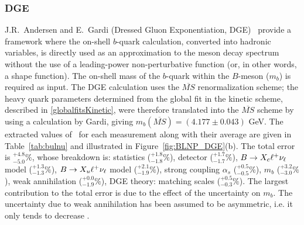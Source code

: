 \subsubsection{DGE}
J.R.~Andersen and E.~Gardi (Dressed Gluon Exponentiation, DGE)~\cite{ref:DGE} provide
a framework where the on-shell $b$-quark calculation, converted into hadronic variables, is
directly used as an approximation to the meson decay spectrum without
the use of a leading-power non-perturbative function (or, in other words,
a shape function). The on-shell mass of the $b$-quark within the $B$-meson ($m_b$) is
required as input. 
The DGE calculation uses the $\overline{MS}$ renormalization scheme; the heavy quark parameters determined  
from the global fit in the kinetic scheme, described in \ref{globalfitsKinetic}, were therefore 
translated into the $\overline{MS}$ scheme by using a calculation by Gardi, giving 
$m_b({\overline{MS}})=(4.177 \pm 0.043)$ GeV.
The extracted values
of \vub\, for each measurement along with their average are given in
Table~\ref{tab:bulnu} and illustrated in Figure~\ref{fig:BLNP_DGE}(b).
The total error is $^{+4.8}_{-5.0}\%$, whose breakdown is:
statistics ($^{+1.8}_{-1.8}\%$),
detector ($^{+1.7}_{-1.7}\%$),
$B\to X_c \ell^+ \nu_\ell$ model ($^{+1.3}_{-1.3}\%$),
$B\to X_u \ell^+ \nu_\ell$ model ($^{+2.1}_{-1.9}\%$),
strong coupling $\alpha_s$ ($^{+0.5}_{-0.5}\%$),
$m_b$ ($^{+3.2}_{-3.0}\%$),
weak annihilation ($^{+0.0}_{-1.9}\%$),
DGE theory: matching scales ($^{+0.5}_{-0.3}\%$).
The largest contribution to the total error is due to the effect of the uncertainty 
on $m_b$. 
The uncertainty due to 
weak annihilation has been assumed to be asymmetric, i.e. it only tends to decrease \vub.


